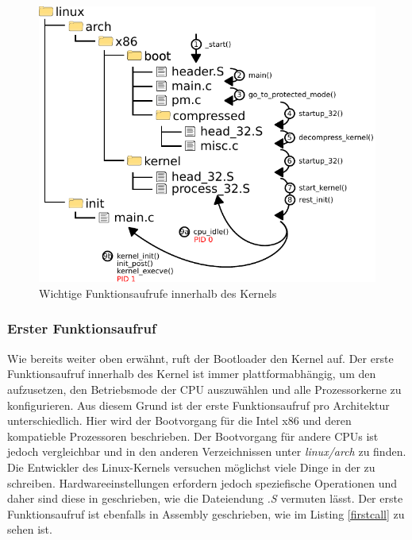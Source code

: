 \clearpage

\begin{figure}[h!]
   \begin{center}
      \includegraphics{images/linux_boot}
   \end{center}
   \caption{Wichtige Funktionsaufrufe innerhalb des Kernels}
   \label{linux_boot}
\end{figure}


\subsubsection{Erster Funktionsaufruf}

Wie bereits weiter oben erwähnt, ruft der Bootloader den Kernel auf. Der erste Funktionsaufruf innerhalb des Kernel ist
immer plattformabhängig, um den  aufzusetzen, den Betriebsmode
der CPU auszuwählen und alle Prozessorkerne zu konfigurieren. Aus diesem Grund ist der erste Funktionsaufruf pro Architektur
unterschiedlich. Hier wird der Bootvorgang für die Intel x86 und deren kompatieble Prozessoren beschrieben. Der Bootvorgang
für andere CPUs ist jedoch vergleichbar und in den anderen Verzeichnissen unter \emph{linux/arch} zu finden. \\

Die Entwickler des Linux-Kernels versuchen möglichst viele Dinge in der  zu schreiben. Hardwareeinstellungen
erfordern jedoch speziefische Operationen und daher sind diese in  geschrieben, wie die Dateiendung \emph{.S} vermuten
lässt. Der erste Funktionsaufruf ist ebenfalls in Assembly geschrieben, wie im Listing \ref{firstcall} zu sehen ist.

